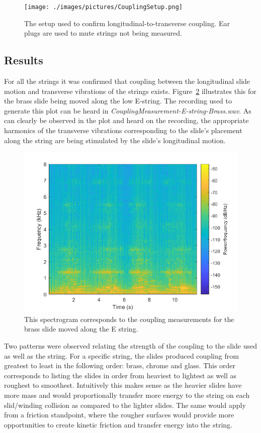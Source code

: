 \documentclass[../main.tex]{subfiles}
\begin{document}
\begin{figure}[h]
    \centering
    \texttt{[image: ./images/pictures/CouplingSetup.png]}
    \caption{The setup used to confirm longitudinal-to-transverse coupling. Ear plugs are used to mute strings not being measured.}
    \label{fig:CouplingSetup}
\end{figure}

\subsection{Results}
For all the strings it was confirmed that coupling between the longitudinal slide motion and transverse vibrations of the strings exists. Figure~\ref{fig:L2CSpectrum} illustrates this for the brass slide being moved along the low E-string. The recording used to generate this plot can be heard in \emph{CouplingMeasurement-E-string-Brass.wav}. As can clearly be observed in the plot and heard on the recording, the appropriate harmonics of the transverse vibrations corresponding to the slide's placement along the string are being stimulated by the slide's longitudinal motion.

\begin{figure}[h]
    \centering
    \includegraphics[scale=.75]{./images/plots/EBrassCoupling.png}
    \caption{This spectrogram corresponds to the coupling measurements for the brass slide moved along the E string.}
    \label{fig:L2CSpectrum}
\end{figure}

Two patterns were observed relating the strength of the coupling to the slide used as well as the string. For a specific string, the slides produced coupling from greatest to least in the following order: brass, chrome and glass. This order corresponds to listing the slides in order from heaviest to lightest as well as roughest to smoothest. Intuitively this makes sense as the heavier slides have more mass and would proportionally transfer more energy to the string on each slid/winding collision as compared to the lighter slides. The same would apply from a friction standpoint, where the rougher surfaces would provide more opportunities to create kinetic friction and transfer energy into the string.
\end{document}
